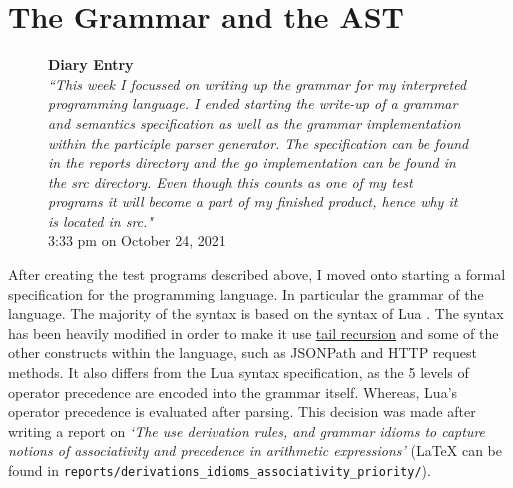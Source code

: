 \section{The Grammar and the AST}

\begin{figure}[H]
    \begin{center}
        \textbf{Diary Entry}\\[0.5em]
        \textit{``This week I focussed on writing up the grammar for my interpreted programming language. I ended starting the write-up of a grammar and semantics specification as well as the grammar implementation within the participle parser generator. The specification can be found in the reports directory and the go implementation can be found in the src directory. Even though this counts as one of my test programs it will become a part of my finished product, hence why it is located in src."}\\[0.5em]
        \tiny{3:33 pm on October 24, 2021}
    \end{center}
\end{figure}

After creating the test programs described above, I moved onto starting a formal specification for the programming language. In particular the grammar of the language. The majority of the syntax is based on the syntax of Lua \textsuperscript{\cite{lua_syntax_specification}}. The syntax has been heavily modified in order to make it use \hyperref[chap:discussion]{tail recursion} and some of the other constructs within the language, such as JSONPath and HTTP request methods. It also differs from the Lua syntax specification, as the 5 levels of operator precedence are encoded into the grammar itself. Whereas, Lua's operator precedence is evaluated after parsing. This decision was made after writing a report on \textit{`The use derivation rules, and grammar idioms to capture notions of associativity and precedence in arithmetic expressions'} (\LaTeX \hspace{0.75mm} can be found in \verb|reports/derivations_idioms_associativity_priority/|).

